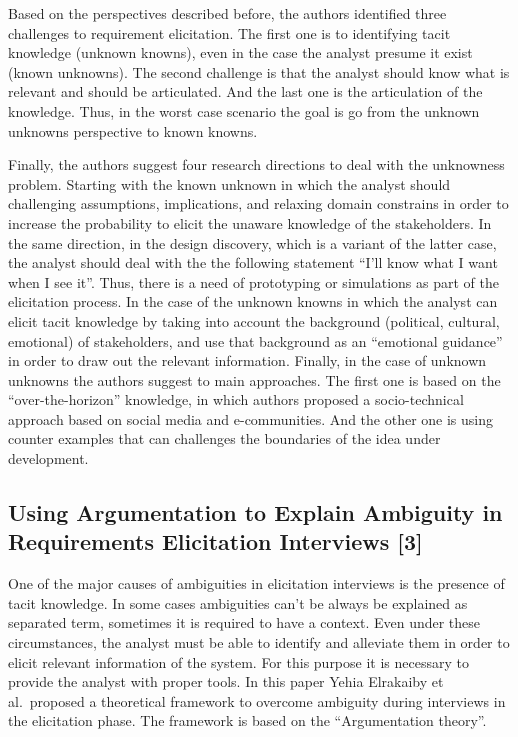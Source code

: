 \documentclass[]{llncs}
\begin{document}
Based on the perspectives described before, the authors identified three
challenges to requirement elicitation. The first one is to identifying
tacit knowledge (unknown knowns), even in the case the analyst presume
it exist (known unknowns). The second challenge is that the analyst
should know what is relevant and should be articulated. And the last one
is the articulation of the knowledge. Thus, in the worst case scenario
the goal is go from the unknown unknowns perspective to known knowns.

Finally, the authors suggest four research directions to deal with the
unknowness problem. Starting with the known unknown in which the analyst
should challenging assumptions, implications, and relaxing domain
constrains in order to increase the probability to elicit the unaware
knowledge of the stakeholders. In the same direction, in the design
discovery, which is a variant of the latter case, the analyst should
deal with the the following statement ``I'll know what I want when I see
it''. Thus, there is a need of prototyping or simulations as part of the
elicitation process. In the case of the unknown knowns in which the
analyst can elicit tacit knowledge by taking into account the background
(political, cultural, emotional) of stakeholders, and use that
background as an ``emotional guidance'' in order to draw out the
relevant information. Finally, in the case of unknown unknowns the
authors suggest to main approaches. The first one is based on the
``over-the-horizon'' knowledge, in which authors proposed a
socio-technical approach based on social media and e-communities. And
the other one is using counter examples that can challenges the
boundaries of the idea under development.

\hypertarget{using-argumentation-to-explain-ambiguity-in-requirements-elicitation-interviews-elrakaiby2017using}{%
\subsection{Using Argumentation to Explain Ambiguity in Requirements
Elicitation Interviews
{[}3{]}}\label{using-argumentation-to-explain-ambiguity-in-requirements-elicitation-interviews-elrakaiby2017using}}

One of the major causes of ambiguities in elicitation interviews is the
presence of tacit knowledge. In some cases ambiguities can't be always
be explained as separated term, sometimes it is required to have a
context. Even under these circumstances, the analyst must be able to
identify and alleviate them in order to elicit relevant information of
the system. For this purpose it is necessary to provide the analyst with
proper tools. In this paper Yehia Elrakaiby et al.~proposed a
theoretical framework to overcome ambiguity during interviews in the
elicitation phase. The framework is based on the ``Argumentation
theory''.
\end{document}
